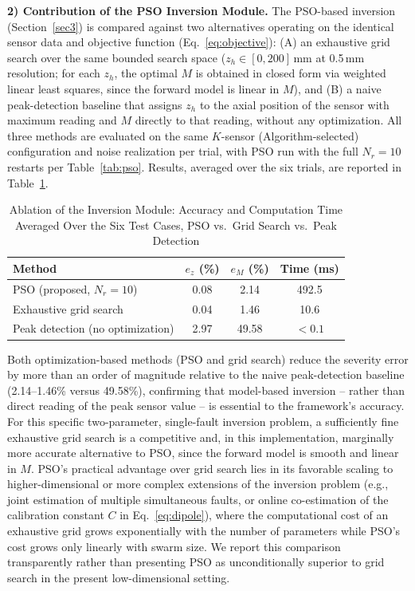 \textbf{2) Contribution of the PSO Inversion Module.}
The PSO-based inversion (Section~\ref{sec3}) is compared against two
alternatives operating on the identical sensor data and objective
function (Eq.~\ref{eq:objective}): (A) an exhaustive grid search over
the same bounded search space ($z_h \in [0,200]$\,mm at 0.5\,mm
resolution; for each $z_h$, the optimal $M$ is obtained in closed form
via weighted linear least squares, since the forward model is linear
in $M$), and (B) a naive peak-detection baseline that assigns $z_h$ to
the axial position of the sensor with maximum reading and $M$ directly
to that reading, without any optimization. All three methods are
evaluated on the same $K$-sensor (Algorithm-selected) configuration and
noise realization per trial, with PSO run with the full $N_r = 10$
restarts per Table~\ref{tab:pso}. Results, averaged over the six
trials, are reported in Table~\ref{tab:ablation_pso}.

\begin{table}[ht]
\centering
\caption{\label{tab:ablation_pso}%
Ablation of the Inversion Module: Accuracy and Computation Time
Averaged Over the Six Test Cases, PSO vs.\ Grid Search vs.\ Peak
Detection}
\begin{tabular}{|l|c|c|c|}
\hline
\textbf{Method} & $e_z$ (\%) & $e_M$ (\%) & Time (ms) \\
\hline
PSO (proposed, $N_r=10$) & 0.08 & 2.14  & 492.5 \\
Exhaustive grid search    & 0.04 & 1.46  & 10.6  \\
Peak detection (no optimization) & 2.97 & 49.58 & $<0.1$ \\
\hline
\end{tabular}
\end{table}

Both optimization-based methods (PSO and grid search) reduce the
severity error by more than an order of magnitude relative to the
naive peak-detection baseline (2.14--1.46\% versus 49.58\%),
confirming that model-based inversion -- rather than direct reading of
the peak sensor value -- is essential to the framework's accuracy.
For this specific two-parameter, single-fault inversion problem, a
sufficiently fine exhaustive grid search is a competitive and, in this
implementation, marginally more accurate alternative to PSO, since the
forward model is smooth and linear in $M$. PSO's practical advantage
over grid search lies in its favorable scaling to higher-dimensional or
more complex extensions of the inversion problem (e.g., joint
estimation of multiple simultaneous faults, or online co-estimation of
the calibration constant $C$ in Eq.~\ref{eq:dipole}), where the
computational cost of an exhaustive grid grows exponentially with the
number of parameters while PSO's cost grows only linearly with swarm
size. We report this comparison transparently rather than presenting
PSO as unconditionally superior to grid search in the present
low-dimensional setting.

